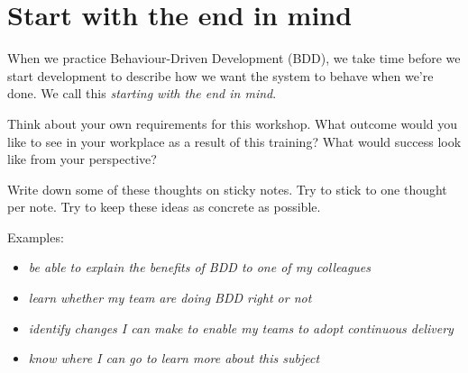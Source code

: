 \chapter*{Start with the end in mind}

When we practice Behaviour-Driven Development (BDD), we take time before we start development to describe how we want the system to behave when we're done. We call this \textit{starting with the end in mind}.

Think about your own requirements for this workshop. What outcome would you like to see in your workplace as a result of this training? What would success look like from your perspective?

Write down some of these thoughts on sticky notes. Try to stick to one thought per note. Try to keep these ideas as concrete as possible.

Examples:
\begin{itemize}
    \item \textit{be able to explain the benefits of BDD to one of my colleagues}
    \item \textit{learn whether my team are doing BDD right or not}
    \item \textit{identify changes I can make to enable my teams to adopt continuous delivery}
    \item \textit{know where I can go to learn more about this subject}
\end{itemize}

